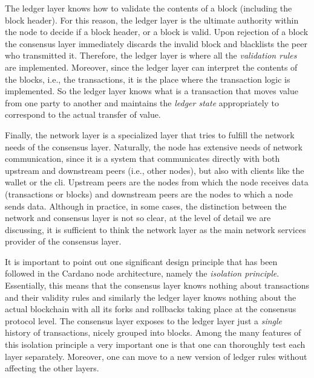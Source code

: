 The ledger layer knows how to validate the contents of a block (including the
block
header). For this reason, the ledger layer is the ultimate authority within the
node to decide if a block header, or a block is valid. Upon rejection
of
a block the consensus layer immediately discards the invalid
block and blacklists the peer who transmitted it. Therefore, the ledger layer
is where all the \emph{validation rules} are implemented. Moreover, since the
ledger layer can interpret the contents of the blocks, i.e., the transactions,
it is the place where the transaction logic is implemented. So the ledger layer
knows what is a transaction that moves value from one party to another and
maintains the \emph{ledger state} appropriately to correspond to the actual
transfer of value.

Finally, the network layer is a specialized layer that tries to fulfill the
network needs of the consensus layer. Naturally, the node has extensive needs
of network communication, since it is a system that communicates directly with
both upstream and downstream peers (i.e., other nodes), but also with clients
like the wallet or the cli. Upstream peers are the nodes from which the
node receives data (transactions or blocks) and downstream peers are the nodes
to which a node sends data. Although in practice, in some cases, the
distinction between the network and consensus layer is not so clear, at the
level of detail we are discussing, it is sufficient to think the network layer
as the main network services provider of the consensus layer.

It is important to point out one significant design principle
that has been followed in the Cardano node architecture, namely the
\emph{isolation principle}. Essentially, this means that the consensus layer
knows nothing about transactions and their validity rules and similarly the
ledger layer knows nothing about the actual blockchain with all its
forks and rollbacks taking place at the consensus protocol level. The consensus
layer exposes to the ledger layer just a \emph{single} history of transactions,
nicely grouped into blocks. Among the many features of this isolation principle
a very important one is that one can thoroughly test each layer separately.
Moreover, one can move to a new version of ledger rules without affecting the
other layers.

